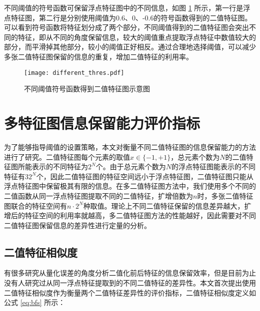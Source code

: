 不同阈值的符号函数可保留浮点特征图中的不同信息，如图 \ref{fig:different_thres} 所示，第一行是浮点特征图，第二行是分别使用阈值为0.6、0、-0.6的符号函数得到的二值特征图。可以看到符号函数将特征划分成了两个部分，不同阈值得到的二值特征图会突出不同的特征，即从不同的角度保留信息，较大的阈值重点提取浮点特征中数值较大的部分，而平滑掉其他部分，较小的阈值正好相反。通过合理地选择阈值，可以减少多张二值特征图保留的信息的重复，增加二值特征的利用率。

\begin{figure}[htb]
  \vspace{6pt}
  \centering
  \texttt{[image: different\_thres.pdf]}
  \caption{不同阈值符号函数得到二值特征图示意图}
  \label{fig:different_thres}
\end{figure}

\section{多特征图信息保留能力评价指标}

为了能够指导阈值的设置策略，本文对衡量不同二值特征图的信息保留能力的方法进行了研究。二值特征图每个元素的取值$x \in \{-1, +1\}$，总元素个数为$N$的二值特征图所能表示的不同特征为$2^N$个。由于总元素个数为$N$的浮点特征图能表示的不同特征有$32^N$个，因此二值特征图的特征空间远小于浮点特征图，二值特征图只能从浮点特征图中保留极其有限的信息。在多二值特征图方法中，我们使用多个不同的二值函数从同一浮点特征图提取不同的二值特征，扩增倍数为$n$时，多张二值特征图联合的特征空间有$n \cdot 2^N$种取值。理论上不同二值特征保留的信息差异越大，扩增后的特征空间的利用率就越高，多二值特征图方法的性能越好，因此需要对不同二值特征图保留信息的差异性进行定量的分析。

\subsection{二值特征相似度}

有很多研究从量化误差的角度分析二值化前后特征的信息保留效率，但是目前为止没有人研究过从同一浮点特征提取到的不同二值特征的差异性。本文首次提出使用二值特征相似度作为衡量两个二值特征差异性的评价指标，二值特征相似度定义如公式 \eqref{eq:bfs} 所示：

